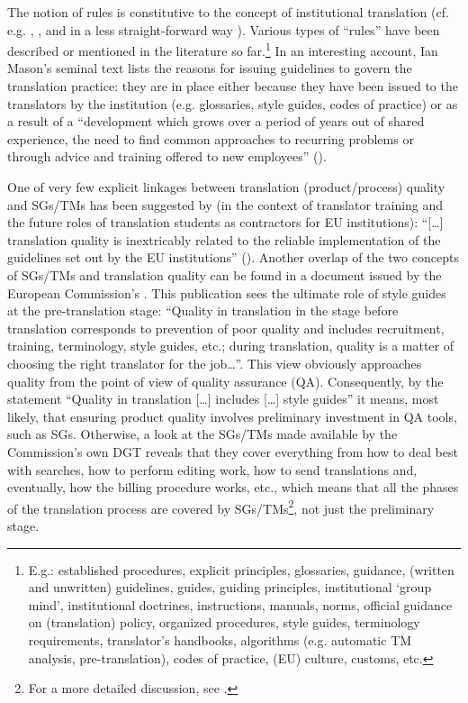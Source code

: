 \documentclass[output=paper]{langsci/langscibook}
\begin{document}
The notion of rules is constitutive to the concept of institutional translation (cf. e.g. \citealt[18]{Koskinen2008}, \citealt[343]{Halverson2008}, \citealt[142]{Kang2009} and in a less straight-forward way \citealt[159]{Becker-Mrotzek1990}). Various types of “rules” have been described or mentioned in the literature so far.\footnote{E.g.: established procedures, explicit principles, glossaries, guidance, (written and unwritten) guidelines, guides, guiding principles, institutional ‘group mind’, institutional doctrines, instructions, manuals, norms, official guidance on (translation) policy, organized procedures, style guides, terminology requirements, translator’s handbooks, algorithms (e.g. automatic TM analysis, pre-translation), codes of practice, (EU) culture, customs, etc.} In an interesting account, Ian Mason’s seminal text \citep{Mason2004[2003]} lists the reasons for issuing guidelines to govern the translation practice: they are in place either because they have been issued to the translators by the institution (e.g. glossaries, style guides, codes of practice) or as a result of a “development which grows over a period of years out of shared experience, the need to find common approaches to recurring problems or through advice and training offered to new employees” (\citeyear[470]{Mason2004[2003]}). 

One of very few explicit linkages between translation (product/process) quality and SGs/TMs has been suggested by \citeauthor{Sosoni2011} (in the context of translator training and the future roles of translation students as contractors for EU institutions): “[…] translation quality is inextricably related to the reliable implementation of the guidelines set out by the EU institutions” (\citeyear[100]{Sosoni2011}). Another overlap of the two concepts of SGs/TMs and translation quality can be found in a document issued by the European Commission’s \citet[17]{DGT2012}. This publication sees the ultimate role of style guides at the pre-translation stage: “Quality in translation in the stage before translation corresponds to prevention of poor quality and includes recruitment, training, terminology, style guides, etc.; during translation, quality is a matter of choosing the right translator for the job…”. This view obviously approaches quality from the point of view of quality assurance (QA). Consequently, by the statement “Quality in translation […] includes […] style guides” it means, most likely, that ensuring product quality involves preliminary investment in QA tools, such as SGs. Otherwise, a look at the SGs/TMs made available by the Commission’s own DGT reveals that they cover everything from how to deal best with searches, how to perform editing work, how to send translations and, eventually, how the billing procedure works, etc., which means that all the phases of the translation process are covered by SGs/TMs\footnote{For a more detailed discussion, see \citealt{Svoboda2008}.}, not just the preliminary stage.
\end{document}
